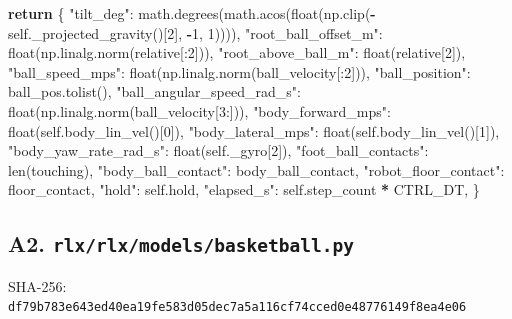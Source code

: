 \documentclass[
  american,
  11pt,
  letterpaper,
]{article}
\newenvironment{Shaded}{\begin{snugshade}}{\end{snugshade}}
\newcommand{\BuiltInTok}[1]{#1}
\newcommand{\ControlFlowTok}[1]{\textcolor[rgb]{0.13,0.29,0.53}{\textbf{#1}}}
\newcommand{\DecValTok}[1]{\textcolor[rgb]{0.00,0.00,0.81}{#1}}
\newcommand{\NormalTok}[1]{#1}
\newcommand{\OperatorTok}[1]{\textcolor[rgb]{0.81,0.36,0.00}{\textbf{#1}}}
\newcommand{\StringTok}[1]{\textcolor[rgb]{0.31,0.60,0.02}{#1}}
\newcommand{\VariableTok}[1]{\textcolor[rgb]{0.00,0.00,0.00}{#1}}
\renewenvironment{Shaded}{\par\smallskip}{\par\smallskip}
\begin{document}
\begin{Shaded}
\begin{Highlighting}[]
        \ControlFlowTok{return}\NormalTok{ \{}
            \StringTok{"tilt\_deg"}\NormalTok{: math.degrees(math.acos(}\BuiltInTok{float}\NormalTok{(np.clip(}\OperatorTok{{-}}\VariableTok{self}\NormalTok{.\_projected\_gravity()[}\DecValTok{2}\NormalTok{], }\OperatorTok{{-}}\DecValTok{1}\NormalTok{, }\DecValTok{1}\NormalTok{)))),}
            \StringTok{"root\_ball\_offset\_m"}\NormalTok{: }\BuiltInTok{float}\NormalTok{(np.linalg.norm(relative[:}\DecValTok{2}\NormalTok{])),}
            \StringTok{"root\_above\_ball\_m"}\NormalTok{: }\BuiltInTok{float}\NormalTok{(relative[}\DecValTok{2}\NormalTok{]),}
            \StringTok{"ball\_speed\_mps"}\NormalTok{: }\BuiltInTok{float}\NormalTok{(np.linalg.norm(ball\_velocity[:}\DecValTok{2}\NormalTok{])),}
            \StringTok{"ball\_position"}\NormalTok{: ball\_pos.tolist(),}
            \StringTok{"ball\_angular\_speed\_rad\_s"}\NormalTok{: }\BuiltInTok{float}\NormalTok{(np.linalg.norm(ball\_velocity[}\DecValTok{3}\NormalTok{:])),}
            \StringTok{"body\_forward\_mps"}\NormalTok{: }\BuiltInTok{float}\NormalTok{(}\VariableTok{self}\NormalTok{.body\_lin\_vel()[}\DecValTok{0}\NormalTok{]),}
            \StringTok{"body\_lateral\_mps"}\NormalTok{: }\BuiltInTok{float}\NormalTok{(}\VariableTok{self}\NormalTok{.body\_lin\_vel()[}\DecValTok{1}\NormalTok{]),}
            \StringTok{"body\_yaw\_rate\_rad\_s"}\NormalTok{: }\BuiltInTok{float}\NormalTok{(}\VariableTok{self}\NormalTok{.\_gyro[}\DecValTok{2}\NormalTok{]),}
            \StringTok{"foot\_ball\_contacts"}\NormalTok{: }\BuiltInTok{len}\NormalTok{(touching),}
            \StringTok{"body\_ball\_contact"}\NormalTok{: body\_ball\_contact,}
            \StringTok{"robot\_floor\_contact"}\NormalTok{: floor\_contact,}
            \StringTok{"hold"}\NormalTok{: }\VariableTok{self}\NormalTok{.hold,}
            \StringTok{"elapsed\_s"}\NormalTok{: }\VariableTok{self}\NormalTok{.step\_count }\OperatorTok{*}\NormalTok{ CTRL\_DT,}
\NormalTok{        \}}
\end{Highlighting}
\end{Shaded}

\subsection{\texorpdfstring{A2.
\texttt{rlx/\allowbreak{}rlx/\allowbreak{}models/\allowbreak{}basketba\allowbreak{}ll.py}}{A2. }}\label{a2.-rlxrlxmodelsbasketball.py}

SHA-256:
\texttt{df79b783\allowbreak{}e643ed40\allowbreak{}ea19fe58\allowbreak{}3d05dec7\allowbreak{}a5a116cf\allowbreak{}74cced0e\allowbreak{}48776149\allowbreak{}f8ea4e06\allowbreak{}}
\end{document}

